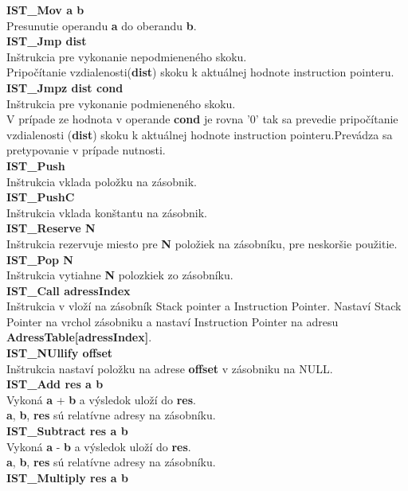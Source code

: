 \documentclass[12pt,a4paper,titlepage,final]{article}
\begin{document}
\textbf{IST\_Mov a b}\\
Presunutie operandu \textbf{a} do oberandu \textbf{b}. \\
\textbf{IST\_Jmp dist}\\
Inštrukcia pre vykonanie nepodmieneného skoku.\\
Pripočítanie vzdialenosti(\textbf{dist}) skoku k aktuálnej hodnote instruction
pointeru.\\
\textbf{IST\_Jmpz dist cond}\\
Inštrukcia pre vykonanie podmieneného skoku.\\
V prípade ze hodnota v operande \textbf{cond} je rovna '0' tak sa prevedie
pripočítanie vzdialenosti (\textbf{dist}) skoku k aktuálnej hodnote instruction
pointeru.Prevádza sa pretypovanie v prípade nutnosti.\\
\textbf{IST\_Push}\\
Inštrukcia vklada položku na zásobnik.\\
\textbf{IST\_PushC}\\
Inštrukcia vklada konštantu na zásobnik.\\
\textbf{IST\_Reserve N}\\
Inštrukcia rezervuje miesto pre \textbf{N} položiek na zásobníku, pre neskoršie
 použitie.\\
\textbf{IST\_Pop N}\\
Inštrukcia vytiahne \textbf{N} polozkiek zo zásobníku.\\
\textbf{IST\_Call adressIndex}\\
Inštrukcia v vloží na zásobník Stack pointer a Instruction Pointer. Nastaví
Stack Pointer na vrchol zásobniku a nastaví Instruction Pointer na adresu
\textbf{AdressTable[adressIndex]}.\\
\textbf{IST\_NUllify offset}\\
Inštrukcia nastaví položku na adrese \textbf{offset} v zásobniku na NULL.\\
\textbf{IST\_Add res a b}\\
Vykoná \textbf{a} + \textbf{b} a výsledok uloží do \textbf{res}.\\
\textbf{a}, \textbf{b}, \textbf{res} sú relatívne adresy na zásobníku.\\
\textbf{IST\_Subtract res a b}\\
Vykoná \textbf{a} - \textbf{b} a výsledok uloží do \textbf{res}.\\
\textbf{a}, \textbf{b}, \textbf{res} sú relatívne adresy na zásobníku.\\
\textbf{IST\_Multiply res a b}\\
\end{document}
